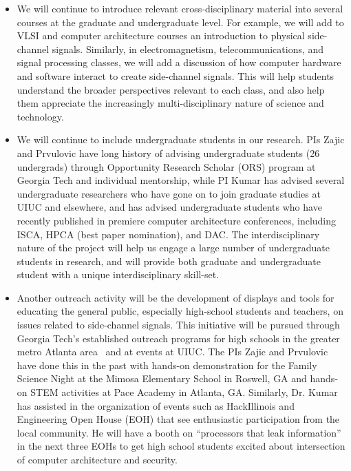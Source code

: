 \documentclass[11 pt]{article}
\begin{document}
\begin{itemize}[topsep=0pt,itemsep=0pt]

\item We will continue to introduce relevant cross-disciplinary material into several courses at the graduate and undergraduate level.
For example, we will add to VLSI and computer architecture courses an introduction to physical side-channel signals.
Similarly, in electromagnetism, telecommunications, and signal processing classes, we will add a discussion of how computer
hardware and software interact to create side-channel signals. This will help students understand the broader perspectives relevant to
each class, and also help them appreciate the increasingly multi-disciplinary nature of science and technology.

\item We will continue to include undergraduate students in our research.
PIs Zajic and Prvulovic have long history of advising undergraduate students (26 undergrads)
through Opportunity Research Scholar (ORS) program at Georgia Tech and individual mentorship,
while PI Kumar has advised several undergraduate researchers who have gone on to join graduate
studies at UIUC and elsewhere, and has advised undergraduate students who have recently published
in premiere computer architecture conferences, including ISCA, HPCA (best paper nomination),
and DAC. The interdisciplinary nature of the project will help us engage a large number of undergraduate
students in research, and will provide both graduate and undergraduate student with a unique interdisciplinary skill-set.

\item Another outreach activity will be the development of displays
  and tools for educating the general public, especially high-school
  students and teachers, on issues related to side-channel signals.
  This initiative will be pursued through Georgia Tech’s established
  outreach programs for high schools in the greater metro Atlanta
  area~\cite{Conrad2022} and at events at UIUC.
  The PIs Zajic and Prvulovic have done this in the past with hands-on
  demonstration for the Family Science Night at the Mimosa Elementary
  School in Roswell, GA and hands-on STEM activities at Pace Academy
  in Atlanta, GA.
Similarly, Dr. Kumar has assisted in the organization of events such as
HackIllinois and Engineering Open House (EOH) that see enthusiastic
participation from the local community.
He will have a booth on ``processors that leak information'' in the next three EOHs to get high school students excited about intersection of computer architecture and security.
\end{itemize}
\end{document}
